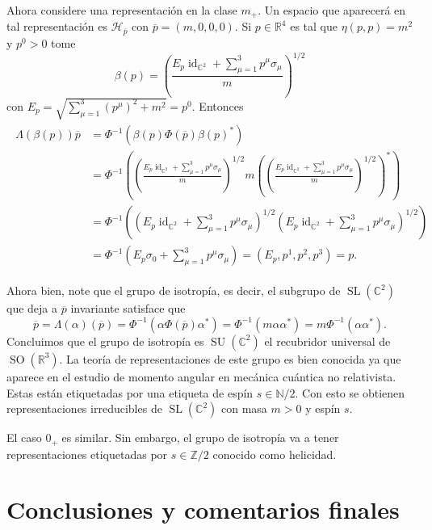 \documentclass[11pt]{article}
\DeclareMathOperator{\Sl}{SL}
\DeclareMathOperator{\SU}{SU}
\DeclareMathOperator{\SO}{SO}
\DeclareMathOperator{\id}{id}
\begin{document}
Ahora considere una representación en la clase $m_+$. Un espacio que aparecerá en tal representación es $\mathcal{H}_{\overline{p}}$ con $\overline{p}=(m,0,0,0)$. Si $p\in\mathbb{R}^4$ es tal que $\eta(p,p)=m^2$ y $p^0>0$ tome 
\begin{equation}
\beta(p)=\left(\frac{E_p\id_{\mathbb{C}^2}+\sum_{\mu=1}^3p^\mu\sigma_\mu}{m}\right)^{1/2}
\end{equation}
con $E_p=\sqrt{\sum_{\mu=1}^3(p^\mu)^2+m^2}=p^0$. Entonces
\begin{align}
\begin{split}
\Lambda(\beta(p))\overline{p}&=\Phi^{-1}(\beta(p)\Phi(\overline{p})\beta(p)^*) \\
&=\Phi^{-1}\left(\left(\frac{E_p\id_{\mathbb{C}^2}+\sum_{\mu=1}^3p^\mu\sigma_\mu}{m}\right)^{1/2}m\left(\left(\frac{E_p\id_{\mathbb{C}^2}+\sum_{\mu=1}^3p^\mu\sigma_\mu}{m}\right)^{1/2}\right)^*\right) \\
& = \Phi^{-1}\left(\left(E_p\id_{\mathbb{C}^2}+\sum_{\mu=1}^3p^\mu\sigma_\mu\right)^{1/2}\left(E_p\id_{\mathbb{C}^2}+\sum_{\mu=1}^3p^\mu\sigma_\mu\right)^{1/2}\right) \\
& = \Phi^{-1}\left(E_p\sigma_0 + \sum_{\mu=1}^3p^\mu\sigma_\mu\right) = (E_p, p^1, p^2, p^3) = p.
\end{split}
\end{align}

Ahora bien, note que el grupo de isotropía, es decir, el subgrupo de $\Sl(\mathbb{C}^2)$ que deja a $\overline{p}$ invariante satisface que
\begin{equation}
\overline{p} = \Lambda(\alpha)(\overline{p}) = \Phi^{-1}(\alpha\Phi(\overline{p})\alpha^*) = \Phi^{-1}(m\alpha\alpha^*)=m\Phi^{-1}(\alpha\alpha^*).
\end{equation} 
Concluimos que el grupo de isotropía es $\SU(\mathbb{C}^2)$ el recubridor universal de $\SO(\mathbb{R}^3)$. La teoría de representaciones de este grupo es bien conocida ya que aparece en el estudio de momento angular en mecánica cuántica no relativista. Estas están etiquetadas por una etiqueta de espín $s\in\mathbb{N}/2$. Con esto se obtienen representaciones irreducibles de $\Sl(\mathbb{C}^2)$ con masa $m>0$ y espín $s$. 

El caso $0_+$ es similar. Sin embargo, el grupo de isotropía va a tener representaciones etiquetadas por $s\in\mathbb{Z}/2$ conocido como helicidad.

\section{Conclusiones y comentarios finales}
\end{document}
